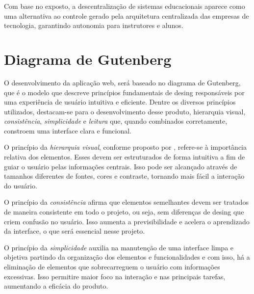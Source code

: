 Com base no exposto, a descentralização de sistemas educacionais aparece como uma alternativa ao controle gerado pela arquitetura centralizada das empresas de tecnologia, garantindo autonomia para instrutores e alunos.


\section{Diagrama de Gutenberg}

O desenvolvimento da aplicação web, será baseado no diagrama de Gutenberg, que é o modelo que descreve princípios fundamentais de desing responsáveis por uma experiência de usuário intuitiva e eficiente. Dentre os diversos princípios utilizados, destacam-se para o desenvolvimento desse produto, {hierarquia visual}, \textit{consistência}, \textit{simplicidade} e \textit{leitura} que, quando combinados corretamente, constroem uma interface clara e funcional.

O princípio da \textit{hierarquia visual}, conforme proposto por \cite{lidwell2010}, refere-se à importância relativa dos elementos. Esses devem ser estruturados de forma intuitiva a fim de guiar o usuário pelas informações centrais. Isso pode ser alcançado através de tamanhos diferentes de fontes, cores  e contraste, tornando mais fácil a interação do usuário.

O princípio da \textit{consistência} afirma que elementos semelhantes devem ser tratados de maneira consistente em todo o projeto, ou seja, sem diferenças de desing que criem confusão no usuário. Isso aumenta a previsibilidade e acelera o aprendizado da interface, o que será essencial nesse projeto.

O princípio da \textit{simplicidade} auxilia na manutenção de uma interface limpa e objetiva partindo da organização dos elementos e funcionalidades e com isso, há a eliminação de elementos que sobrecarreguem o usuário com informações excessivas. Isso permitire maior foco na interação e nas principais tarefas, aumentando a eficácia do produto.

